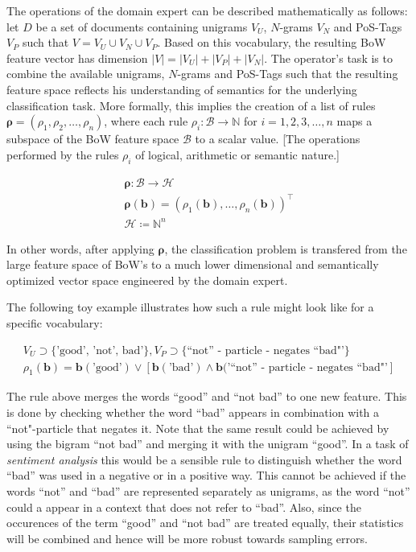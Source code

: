 The operations of the domain expert can be described mathematically as follows: 
let $D$ be a set of documents containing unigrams $V_U$, $N$-grams $V_N$ and
PoS-Tags $V_P$ such that $V = V_U \cup V_N \cup V_P$. Based on this vocabulary, the resulting BoW
feature vector has dimension $|V| = |V_U| + |V_P| + |V_N|$.
The operator's task is to combine the available unigrams, $N$-grams and PoS-Tags
such that the resulting feature space reflects his understanding
of semantics for the underlying classification task.
More formally, this implies the creation of a list of rules
$\boldsymbol{\rho} = (\rho_1, \rho_2, \ldots, \rho_n)$, where each rule $\rho_i:
\mathcal{B} \to \mathbb{N}$ for $i=1,2,3,\ldots,n$ maps a subspace of the BoW
feature space $\mathcal{B}$ to a scalar value.
[The operations performed by the rules $\rho_i$ of logical, arithmetic or
semantic nature.]

\begin{eqnarray*}
\boldsymbol\rho: \mathcal{B} \to \mathcal{H} \\
\boldsymbol{\rho}(\mathbf{b}) = (\rho_1(\mathbf{b}), \ldots,
\rho_n(\mathbf{b}))^\intercal \\
\mathcal{H} \coloneqq \mathbb{N}^n
\end{eqnarray*}

In other words, after applying $\boldsymbol\rho$, the classification problem is
transfered from the large feature space of BoW's to a much lower dimensional and semantically optimized
vector space engineered by the domain expert.

The following toy example illustrates how such a rule might look
like for a specific vocabulary: 

\begin{eqnarray*}
V_U \supset \{\text{'good', 'not', bad'}\}, V_P \supset \{\text{``not'' - particle -
negates\ ``bad"'}\} \\
\rho_1(\mathbf{b}) = \mathbf{b}(\text{'good'}) \lor \left[\mathbf{b}(\text{'bad'})
\land \mathbf{b}(\text{'``not'' - particle - negates\ ``bad"'}\right]
\end{eqnarray*}

The rule above merges the words ``good'' and ``not bad'' to one new feature.
This is done by checking whether the word ``bad'' appears in combination with a
``not"-particle that negates it. Note that the same result could be achieved
by using the bigram ``not bad'' and merging it with the unigram ``good''.
In a task of \emph{sentiment analysis} this would be a sensible rule to
distinguish whether the word ``bad'' was used in a negative or in a positive
way. This cannot be achieved if the words ``not''
and ``bad'' are represented separately as unigrams, as the word ``not'' could a
appear in a context that does not refer to ``bad''.
Also, since the occurences of the term ``good'' and ``not bad'' are treated
equally, their statistics will be combined and hence will be more robust towards
sampling errors.

